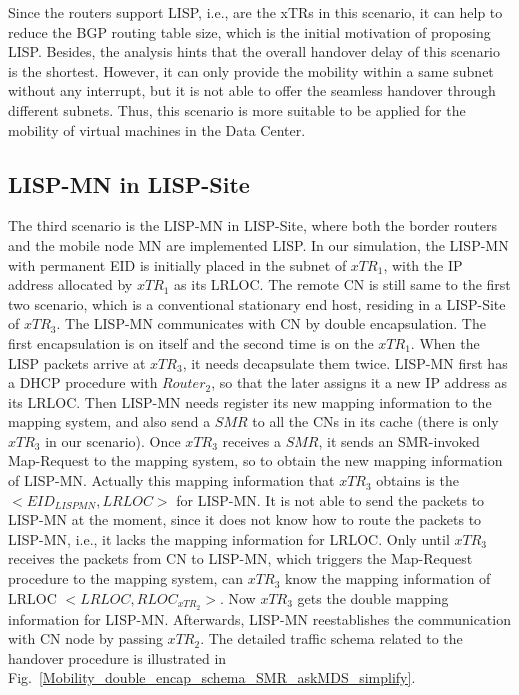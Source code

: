 Since the routers support LISP, i.e., are the xTRs in this scenario, it can help to reduce the BGP routing table size, which is the initial motivation of proposing LISP. Besides, the analysis hints that the overall handover delay of this scenario is the shortest. However, it can only provide the mobility within a same subnet without any interrupt, but it is not able to offer the seamless handover through different subnets. Thus, this scenario is more suitable to be applied for the mobility of virtual machines in the Data Center.

\subsection{LISP-MN in LISP-Site}
\label{sec:ns3_analysis_lispmn_xTR}
The third scenario is the LISP-MN in LISP-Site, where both the border routers and the mobile node MN are implemented LISP. In our simulation, the LISP-MN with permanent EID is initially placed in the subnet of $xTR_1$, with the IP address allocated by $xTR_1$ as its LRLOC. The remote CN is still same to the first two scenario, which is a conventional stationary end host, residing in a LISP-Site of $xTR_3$. The LISP-MN communicates with CN by double encapsulation. The first encapsulation is on itself and the second time is on the $xTR_1$. When the LISP packets arrive at $xTR_3$, it needs decapsulate them twice. %
LISP-MN first has a DHCP procedure with $Router_2$, so that the later assigns it a new IP address as its LRLOC. Then LISP-MN needs register its new mapping information to the mapping system, and also send a $SMR$ to all the CNs in its cache (there is only $xTR_3$ in our scenario). Once $xTR_3$ receives a $SMR$, it sends an SMR-invoked Map-Request to the mapping system, so to obtain the new mapping information of LISP-MN. Actually this mapping information that $xTR_3$ obtains is the $<EID_{LISPMN}, LRLOC>$ for LISP-MN. It is not able to send the packets to LISP-MN at the moment, since it does not know how to route the packets to LISP-MN, i.e., it lacks the mapping information for LRLOC. Only until $xTR_3$ receives the packets from CN to LISP-MN, which triggers the Map-Request procedure to the mapping system, can $xTR_3$ know the mapping information of LRLOC $<LRLOC, RLOC_{xTR_2}>$. Now $xTR_3$ gets the double mapping information for LISP-MN. Afterwards, LISP-MN reestablishes the communication with CN node by passing $xTR_2$. The detailed traffic schema related to the handover procedure is illustrated in Fig.~\ref{Mobility_double_encap_schema_SMR_askMDS_simplify}.
